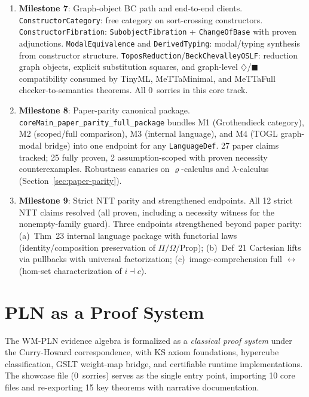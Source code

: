 \documentclass[]{article}
\newcommand{\code}[1]{\texttt{#1}}
\newcommand{\codepath}[1]{\path{#1}}
\newcommand{\rhocalc}{\ensuremath{\varrho}}
\newcommand{\Dia}{\ensuremath{\diamondsuit}}
\newcommand{\Bx}{\ensuremath{\blacksquare}}
\begin{document}
\begin{enumerate}
\item[\checkmark] \textbf{Milestone 7}: Graph-object BC path and end-to-end clients.
  \code{ConstructorCategory}: free category on sort-crossing constructors.
  \code{ConstructorFibration}: \code{SubobjectFibration} + \code{ChangeOfBase}
  with proven adjunctions.
  \code{ModalEquivalence} and \code{DerivedTyping}: modal/typing synthesis from
  constructor structure.
  \code{ToposReduction}/\code{BeckChevalleyOSLF}: reduction graph objects, explicit
  substitution squares, and graph-level $\Dia$/$\Bx$ compatibility consumed by
  TinyML, MeTTaMinimal, and MeTTaFull checker-to-semantics theorems.
  All 0~sorries in this core track.

\item[\checkmark] \textbf{Milestone 8}: Paper-parity canonical package.
  \code{coreMain\_paper\_parity\_full\_package} bundles M1 (Grothendieck
  category), M2 (scoped/full comparison), M3 (internal language), and M4
  (TOGL graph-modal bridge) into one endpoint for any \code{LanguageDef}.
  27 paper claims tracked; 25 fully proven, 2 assumption-scoped with proven
  necessity counterexamples.  Robustness canaries on \rhocalc{}-calculus and
  $\lambda$-calculus (Section~\ref{sec:paper-parity}).

\item[\checkmark] \textbf{Milestone 9}: Strict NTT parity and strengthened endpoints.
  All 12 strict NTT claims resolved (all proven, including a necessity
  witness for the nonempty-family guard).  Three endpoints strengthened
  beyond paper parity:
  (a)~Thm~23 internal language package with functorial laws (identity/composition preservation of
  $\Pi/\Omega/\mathrm{Prop}$);
  (b)~Def~21 Cartesian lifts via pullbacks with universal factorization;
  (c)~image-comprehension full $\leftrightarrow$ (hom-set characterization
  of $i \dashv c$).
\end{enumerate}

\section{PLN as a Proof System}
\label{sec:pln-proof-system}

The WM-PLN evidence algebra is formalized as a \emph{classical proof system}
under the Curry-Howard correspondence, with KS axiom foundations, hypercube
classification, GSLT weight-map bridge, and certifiable runtime implementations.
The showcase file \codepath{Logic/PLNProofSystemShowcase.lean} (0~sorries) serves
as the single entry point, importing 10 core files and re-exporting 15 key theorems
with narrative documentation.
\end{document}
